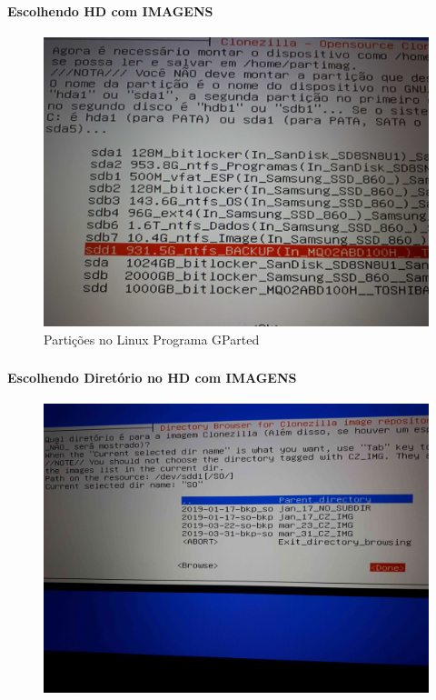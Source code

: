 \documentclass{beamer}
\begin{document}
\begin{frame}[plain,c]
   \frametitle{\insertsection}
    \framesubtitle{Escolhendo HD com IMAGENS}
    \begin{figure}[!h]
        \includegraphics[width=1\linewidth]{images/backup/bkp10.jpg}
        \caption{Partições no Linux Programa GParted}
    \end{figure}
\end{frame}

\begin{frame}[plain,c]
   \frametitle{\insertsection}
    \framesubtitle{Escolhendo Diretório no HD  com IMAGENS}
    \begin{figure}[!h]
        \includegraphics[width=1\linewidth]{images/rest/res1.jpg}
    \end{figure}
\end{frame}
\end{document}
